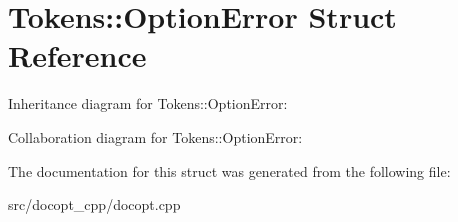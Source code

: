\hypertarget{structTokens_1_1OptionError}{}\section{Tokens\+:\+:Option\+Error Struct Reference}
\label{structTokens_1_1OptionError}


Inheritance diagram for Tokens\+:\+:Option\+Error\+:


Collaboration diagram for Tokens\+:\+:Option\+Error\+:


The documentation for this struct was generated from the following file\+:\begin{DoxyCompactItemize}
\item 
src/docopt\+\_\+cpp/docopt.\+cpp\end{DoxyCompactItemize}
